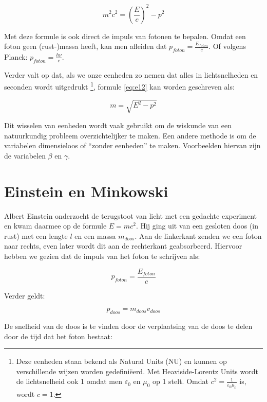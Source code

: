 \begin{equation}
m^{2}c^{2}=\left(\frac{E}{c}\right)^{2}-p^{2}\label{eq:e12}
\end{equation}


Met deze formule is ook direct de impuls van fotonen te bepalen. Omdat
een foton geen (rust-)massa heeft, kan men afleiden dat
$p_{foton}=\frac{E_{foton}}{c}$. Of volgens Planck:
$p_{foton}=\frac{h\nu}{c}$.

Verder valt op dat, als we onze eenheden zo nemen dat alles in
lichtsnelheden en seconden wordt uitgedrukt \footnote{Deze eenheden
staan bekend als Natural Units (NU) en kunnen op verschillende wijzen
worden gedefiniëerd. Met Heaviside-Lorentz Units wordt de lichtsnelheid
ook 1 omdat men $\varepsilon_{0}$ en $\mu_{0}$ op 1 stelt. Omdat
$c^{2}=\frac{1}{\varepsilon_{0}\mu_{0}}$ is, wordt $c=1$.}, formule
\ref{eq:e12} kan worden geschreven als:

\begin{equation}
m=\sqrt{E^{2}-p^{2}}
\end{equation}


Dit wisselen van eenheden wordt vaak gebruikt om de wiskunde van een
natuurkundig probleem overzichtelijker te maken. Een andere methode
is om de variabelen dimensieloos of ``zonder eenheden'' te maken.
Voorbeelden hiervan zijn de variabelen $\beta$ en $\gamma$.


\section{\label{sec:Einstein-en-Minkowski}Einstein en Minkowski}

Albert Einstein onderzocht de terugstoot van licht met een gedachte
experiment en kwam daarmee op de formule $E=mc^{2}$. Hij ging uit
van een gesloten doos (in rust) met een lengte $l$ en een massa $m_{doos}$.
Aan de linkerkant zenden we een foton naar rechts, even later wordt
dit aan de rechterkant geabsorbeerd. Hiervoor hebben we gezien dat
de impuls van het foton te schrijven als:

\begin{equation}
p_{foton}=\frac{E_{foton}}{c}
\end{equation}


Verder geldt:

\begin{equation}
p_{doos}=m_{doos}v_{doos}
\end{equation}


De snelheid van de doos is te vinden door de verplaatsing van de doos
te delen door de tijd dat het foton bestaat:

